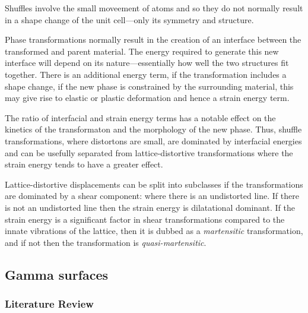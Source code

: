 \documentclass[11pt]{article}
\begin{document}
\begin{enumerate}
\begin{enumerate}
Shuffles involve the small moveement of atoms and so they do not normally
result in a shape change of the unit cell---only its symmetry and structure. 

Phase transformations normally result in the creation of an interface between
the transformed and parent material. 
The energy required to generate this new interface will depend on its
nature---essentially how well the two structures fit together. There is an
additional energy term, if the transformation includes a shape change,
if the new phase is constrained by the surrounding material, this may give
rise to  elastic or plastic deformation and hence a strain energy term. 

The ratio of interfacial and strain energy terms has a notable effect on the
kinetics of the transformaton and the morphology of the new phase. Thus,
shuffle transformations, where distortons are small, are dominated by
interfacial energies and can be usefully separated from lattice-distortive
transformations where the strain energy tends to have a greater effect. 

Lattice-distortive displacements can be split into subclasses if the
transformations are dominated by a shear component: where there is an
undistorted line. If there is not an undistorted line then the strain energy
is dilatational dominant. If the strain energy is a significant factor in shear
transformations compared to the innate vibrations of the lattice, 
then it is dubbed as a \emph{martensitic} transformation, and if not
then the transformation is \emph{quasi-martensitic}.
\end{enumerate}
\end{enumerate}

\subsection{Gamma surfaces}
\label{sec:org97fb10b}

\subsubsection{Literature Review}
\label{sec:orgea0d2e9}
\end{document}
